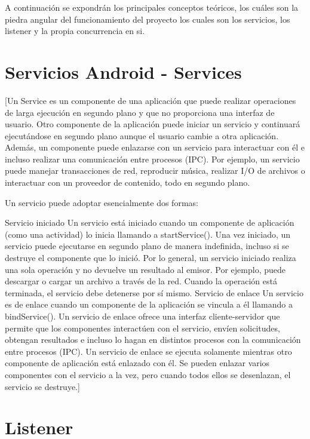A continuación se expondrán los principales conceptos teóricos, los cuáles son la piedra angular del funcionamiento del proyecto los cuales son los servicios, los listener y la propia concurrencia en si.


\section{Servicios Android - Services}
[Un Service es un componente de una aplicación que puede realizar operaciones de larga ejecución en segundo plano y que no proporciona una interfaz de usuario. Otro componente de la aplicación puede iniciar un servicio y continuará ejecutándose en segundo plano aunque el usuario cambie a otra aplicación. Además, un componente puede enlazarse con un servicio para interactuar con él e incluso realizar una comunicación entre procesos (IPC). Por ejemplo, un servicio puede manejar transacciones de red, reproducir música, realizar I/O de archivos o interactuar con un proveedor de contenido, todo en segundo plano.

Un servicio puede adoptar esencialmente dos formas:

Servicio iniciado
Un servicio está iniciado cuando un componente de aplicación (como una actividad) lo inicia llamando a startService(). Una vez iniciado, un servicio puede ejecutarse en segundo plano de manera indefinida, incluso si se destruye el componente que lo inició. Por lo general, un servicio iniciado realiza una sola operación y no devuelve un resultado al emisor. Por ejemplo, puede descargar o cargar un archivo a través de la red. Cuando la operación está terminada, el servicio debe detenerse por sí mismo.
Servicio de enlace
Un servicio es de enlace cuando un componente de la aplicación se vincula a él llamando a bindService(). Un servicio de enlace ofrece una interfaz cliente-servidor que permite que los componentes interactúen con el servicio, envíen solicitudes, obtengan resultados e incluso lo hagan en distintos procesos con la comunicación entre procesos (IPC). Un servicio de enlace se ejecuta solamente mientras otro componente de aplicación está enlazado con él. Se pueden enlazar varios componentes con el servicio a la vez, pero cuando todos ellos se desenlazan, el servicio se destruye.] \cite{servicios}

\section{Listener}

